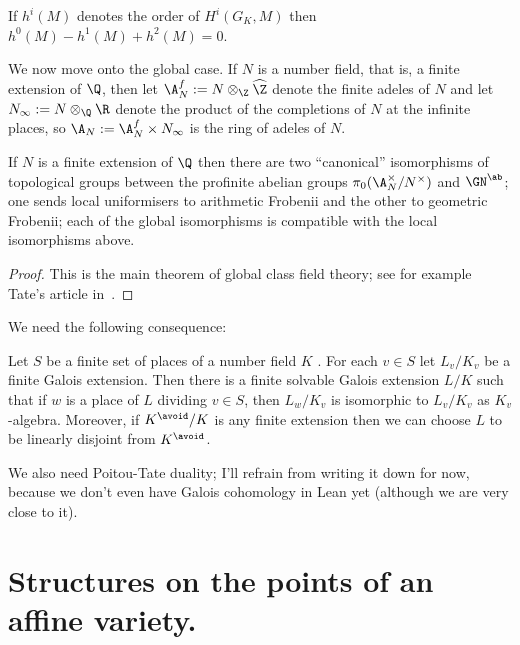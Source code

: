 \begin{theorem} \label{local_galois_coh_euler_poincare}\notready
    If $h^i(M)$ denotes the order of $H^i(G_K,M)$ then $h^0(M)-h^1(M)+h^2(M)=0$.
\end{theorem}

We now move onto the global case. If $N$ is a number field, that is, a finite extension of $\Q$,
then let $\A_N^f:= N\otimes_{\Z}\widehat{\Z}$
denote the finite adeles of $N$ and let $N_\infty := N\otimes_{\Q}\R$ denote the product of the completions of $N$ at the infinite places, so $\A_N:=\A_N^f\times N_\infty$ is the ring of adeles of $N$.

\begin{theorem}\label{global_class_field_theory}\notready If $N$ is a finite extension of $\Q$ then there are two ``canonical'' isomorphisms of topological groups between the profinite abelian groups $\pi_0(\A_N^\times/N^\times)$ and $\GN^{\ab}$; one sends local uniformisers to arithmetic Frobenii and the other to geometric Frobenii; each of the global isomorphisms is compatible with the local isomorphisms above.
\end{theorem}
\begin{proof}\notready This is the main theorem of global class field theory; see for example Tate's article in~\cite{cf}.
\end{proof}

We need the following consequence:

\begin{theorem}\label{Skinner_Wiles_CFT_trick}\notready Let $S$ be a finite set of places of a number field $K$ . For each $v \in S$
let $L_v/K_v$ be a finite Galois extension. Then there is a finite solvable Galois extension
$L/K$ such that if $w$ is a place of $L$ dividing $v \in S$, then $L_w/K_v$ is isomorphic to $L_v/K_v$ as $K_v$-algebra. Moreover, if $K^{\avoid} /K$ is
any finite extension then we can choose $L$ to be linearly disjoint from $K^{\avoid}$.
\end{theorem}

We also need Poitou-Tate duality; I'll refrain from writing it down for now, because we don't even have Galois cohomology in Lean yet (although we are very close to it).

\section{Structures on the points of an affine variety.}

